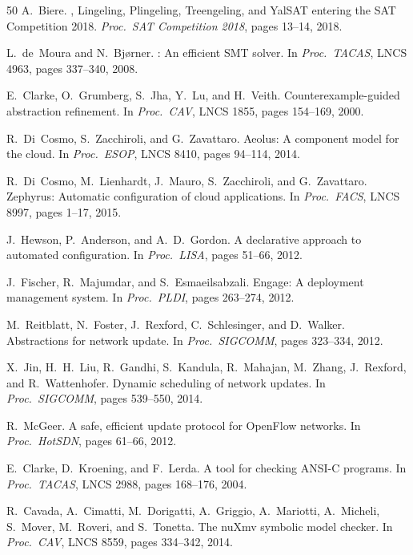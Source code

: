\documentclass[10pt,twocolumn]{article}
\begin{document}
\begin{thebibliography}{50}
A.~Biere.
, {Lingeling}, {Plingeling}, {Treengeling}, and {YalSAT} entering the {SAT Competition} 2018.
\newblock \emph{Proc.\ SAT Competition 2018}, pages 13--14, 2018.

L.~de~Moura and N.~Bj{\o}rner.
: An efficient {SMT} solver.
\newblock In \emph{Proc.\ TACAS}, LNCS 4963, pages 337--340, 2008.

E.~Clarke, O.~Grumberg, S.~Jha, Y.~Lu, and H.~Veith.
\newblock Counterexample-guided abstraction refinement.
\newblock In \emph{Proc.\ CAV}, LNCS 1855, pages 154--169, 2000.

R.~Di~Cosmo, S.~Zacchiroli, and G.~Zavattaro.
\newblock Aeolus: A component model for the cloud.
\newblock In \emph{Proc.\ ESOP}, LNCS 8410, pages 94--114, 2014.

R.~Di~Cosmo, M.~Lienhardt, J.~Mauro, S.~Zacchiroli, and G.~Zavattaro.
\newblock Zephyrus: Automatic configuration of cloud applications.
\newblock In \emph{Proc.\ FACS}, LNCS 8997, pages 1--17, 2015.

J.~Hewson, P.~Anderson, and A.~D.~Gordon.
\newblock A declarative approach to automated configuration.
\newblock In \emph{Proc.\ LISA}, pages 51--66, 2012.

J.~Fischer, R.~Majumdar, and S.~Esmaeilsabzali.
\newblock Engage: A deployment management system.
\newblock In \emph{Proc.\ PLDI}, pages 263--274, 2012.

M.~Reitblatt, N.~Foster, J.~Rexford, C.~Schlesinger, and D.~Walker.
\newblock Abstractions for network update.
\newblock In \emph{Proc.\ SIGCOMM}, pages 323--334, 2012.

X.~Jin, H.~H.~Liu, R.~Gandhi, S.~Kandula, R.~Mahajan, M.~Zhang, J.~Rexford, and R.~Wattenhofer.
\newblock Dynamic scheduling of network updates.
\newblock In \emph{Proc.\ SIGCOMM}, pages 539--550, 2014.

R.~McGeer.
\newblock A safe, efficient update protocol for {OpenFlow} networks.
\newblock In \emph{Proc.\ HotSDN}, pages 61--66, 2012.

E.~Clarke, D.~Kroening, and F.~Lerda.
\newblock A tool for checking {ANSI-C} programs.
\newblock In \emph{Proc.\ TACAS}, LNCS 2988, pages 168--176, 2004.

R.~Cavada, A.~Cimatti, M.~Dorigatti, A.~Griggio, A.~Mariotti, A.~Micheli, S.~Mover, M.~Roveri, and S.~Tonetta.
\newblock The {nuXmv} symbolic model checker.
\newblock In \emph{Proc.\ CAV}, LNCS 8559, pages 334--342, 2014.


\end{thebibliography}
\end{document}
